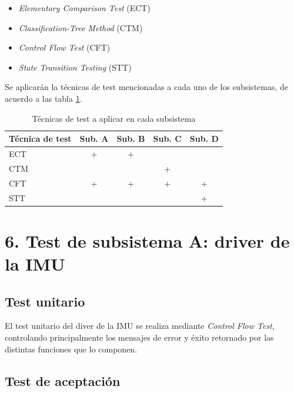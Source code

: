 \documentclass[
11pt, %
codirector, %
]{simple_charter}
\begin{document}
\begin{itemize}
	\item \textit{Elementary Comparison Test} (ECT)
	\item \textit{Classification-Tree Method} (CTM)
	\item \textit{Control Flow Test} (CFT)
	\item \textit{State Transition Testing} (STT)
\end{itemize}

Se aplicarán la técnicas de test mencionadas a cada uno de los subsistemas, de acuerdo a las tabla
\ref{tab:tec-subsys}.

\begin{table}[H]
\centering
\begin{tabular}{@{}lcccc@{}}
\toprule
Técnica de test & Sub. A & Sub. B & Sub. C & Sub. D \\ \midrule
ECT & + & + &  &  \\
CTM &  &  & + &  \\
CFT & + & + & + & + \\
STT &  &  &  & + \\ \bottomrule
\end{tabular}
\caption{Técnicas de test a aplicar en cada subsistema}
\label{tab:tec-subsys}
\end{table}

\section{6. Test de subsistema A: driver de la IMU}
\label{sec:6-test-de-subsistema-a-driver-de-la-imu}

\subsection{Test unitario}
\label{ssec:test-unitario}

El test unitario del diver de la IMU se realiza mediante \textit{Control Flow Test},
controlando principalmente los mensajes de error y éxito retornado por las distintas funciones
que lo componen.


\subsection{Test de aceptación}
\label{ssec:test-de-aceptacion}
\end{document}
